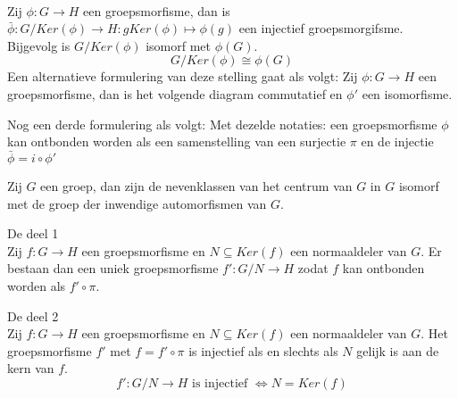 \documentclass[main.tex]{subfiles}
\begin{document}
\begin{st}
  \\
  Zij $\phi: G \rightarrow H$ een groepsmorfisme, dan is $\bar{\phi}: G/Ker(\phi) \rightarrow H: gKer(\phi) \mapsto \phi(g)$ een injectief groepsmorgifsme.
  Bijgevolg is $G/Ker(\phi)$ isomorf met $\phi(G)$.
  \[ G/Ker(\phi) \cong \phi(G) \]
  Een alternatieve formulering van deze stelling gaat als volgt:
  Zij $\phi: G \rightarrow H$ een groepsmorfisme, dan is het volgende diagram commutatief en $\phi'$ een isomorfisme.
  \begin{figure}[H]
    \centering
  \end{figure}
  Nog een derde formulering als volgt:
  Met dezelde notaties: een groepsmorfisme $\phi$ kan ontbonden worden als een samenstelling van een surjectie $\pi$ en de injectie $\bar{\phi} = i \circ \phi'$
\end{st}

\begin{pr}
  Zij $G$ een groep, dan zijn de nevenklassen van het centrum van $G$ in $G$ isomorf met de groep der inwendige automorfismen van $G$.
\end{pr}

\begin{st}
De  deel 1\\
Zij $f: G\rightarrow H$ een groepsmorfisme en $N\subseteq Ker(f)$ een normaaldeler van $G$.
Er bestaan dan een uniek groepsmorfisme $f':G/N \rightarrow H$ zodat $f$ kan ontbonden worden als $f'\circ \pi$.
\end{st}

\begin{st}
De  deel 2\\
Zij $f: G\rightarrow H$ een groepsmorfisme en $N\subseteq Ker(f)$ een normaaldeler van $G$.
Het groepsmorfisme $f'$ met $f = f'\circ \pi$ is injectief als en slechts als $N$ gelijk is aan de kern van $f$.
\[ f':G/N \rightarrow H \text{ is injectief } \Leftrightarrow N = Ker(f) \]
\end{st}
\end{document}
